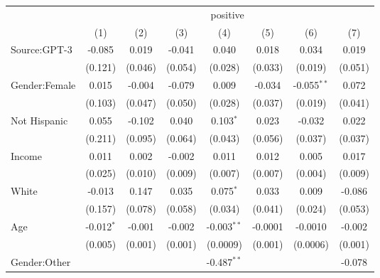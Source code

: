 
\begingroup
\centering
\begin{tabular}{lccccccc}
   \toprule
    & \multicolumn{7}{c}{positive}\\
                            & (1)           & (2)           & (3)           & (4)           & (5)           & (6)           & (7)\\  
   \midrule 
   Source:GPT-3             & -0.085        & 0.019         & -0.041        & 0.040         & 0.018         & 0.034         & 0.019\\   
                            & (0.121)       & (0.046)       & (0.054)       & (0.028)       & (0.033)       & (0.019)       & (0.051)\\   
   Gender:Female            & 0.015         & -0.004        & -0.079        & 0.009         & -0.034        & -0.055$^{**}$ & 0.072\\   
                            & (0.103)       & (0.047)       & (0.050)       & (0.028)       & (0.037)       & (0.019)       & (0.041)\\   
   Not Hispanic             & 0.055         & -0.102        & 0.040         & 0.103$^{*}$   & 0.023         & -0.032        & 0.022\\   
                            & (0.211)       & (0.095)       & (0.064)       & (0.043)       & (0.056)       & (0.037)       & (0.037)\\   
   Income                   & 0.011         & 0.002         & -0.002        & 0.011         & 0.012         & 0.005         & 0.017\\   
                            & (0.025)       & (0.010)       & (0.009)       & (0.007)       & (0.007)       & (0.004)       & (0.009)\\   
   White                    & -0.013        & 0.147         & 0.035         & 0.075$^{*}$   & 0.033         & 0.009         & -0.086\\   
                            & (0.157)       & (0.078)       & (0.058)       & (0.034)       & (0.041)       & (0.024)       & (0.053)\\   
   Age                      & -0.012$^{*}$  & -0.001        & -0.002        & -0.003$^{**}$ & -0.0001       & -0.0010       & -0.002\\   
                            & (0.005)       & (0.001)       & (0.001)       & (0.0009)      & (0.001)       & (0.0006)      & (0.001)\\   
   Gender:Other             &               &               &               & -0.487$^{**}$ &               &               & -0.078\\   

\end{tabular}
